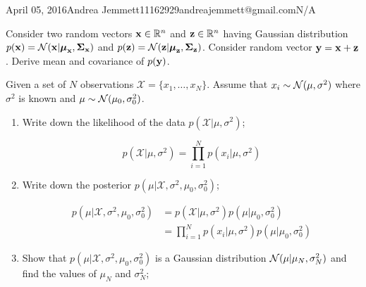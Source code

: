 \documentclass{amsmlaj}
\begin{document}
{April 05, 2016}{Andrea Jemmett}{11162929}{andreajemmett@gmail.com}{N/A}


\begin{problem}
Consider two random vectors $\bm{\mathbf{x}} \in {\mathbb R}^n$ and $\bm{\mathbf{z}} \in {\mathbb R}^n$ having
Gaussian distribution  $p(\bm{\mathbf{x}}) = \mathcal{N}(\bm{\mathbf{x}} | \bm{\mathbf{\mu}}_{\bm{\mathbf{x}}},
\bm{\mathbf{\Sigma}}_{\bm{\mathbf{x}}})$ and  $p(\bm{\mathbf{z}}) = \mathcal{N}(\bm{\mathbf{z}} | \bm{\mathbf{\mu}}_{\bm{\mathbf{z}}},
\bm{\mathbf{\Sigma}}_{\bm{\mathbf{z}}})$.  Consider random vector $\bm{\mathbf{y}} = \bm{\mathbf{x}} + \bm{\mathbf{z}}$.
Derive mean and covariance of $p(\bm{\mathbf{y}})$.
\end{problem}

\begin{problem}
Given a set of $N$ observations $\mathcal{X} = \{x_1,\dots,x_N\}$.
Assume that $x_i \sim \mathcal{N}(\mu,\sigma^2)$ where $\sigma^2$ is known
and $\mu \sim \mathcal{N}(\mu_0,\sigma_0^2)$. 
\begin{enumerate}
\item Write down the likelihood of the data
				$p(\mathcal{X}|\mu,\sigma^2)$;
		
	\begin{equation}
		p(\mathcal{X}|\mu,\sigma^2)=\prod_{i=1}^{N}p(x_i|\mu,\sigma^2)
	\end{equation}

\item Write down the posterior $p(\mu|\mathcal{X},\sigma^2,
				\mu_0,\sigma_0^2)$;

	\begin{equation}
		\begin{split}
		p(\mu|\mathcal{X},\sigma^2,\mu_0,\sigma_0^2)
			&=p(\mathcal{X}|\mu,\sigma^2)p(\mu|\mu_0,\sigma_0^2) \\
			&=\prod_{i=1}^{N}p(x_i|\mu,\sigma^2)p(\mu|\mu_0,\sigma_0^2)
		\end{split}
	\end{equation}

\item Show that $p(\mu|\mathcal{X},\sigma^2, \mu_0,\sigma_0^2)$
				is a Gaussian distribution
				$\mathcal{N}(\mu|\mu_N,\sigma_N^2)$ and find the values of
				$\mu_N$ and $\sigma_N^2$;


\end{enumerate}
\end{problem}
\end{document}
